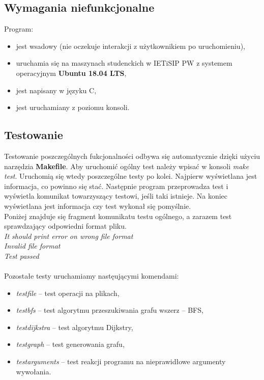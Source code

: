 \documentclass{article}
\begin{document}
\subsection{Wymagania niefunkcjonalne}
Program:
\begin{itemize}
    \item jest wsadowy (nie oczekuje interakcji z użytkownikiem po uruchomieniu),
    \item uruchamia się na maszynach studenckich w IETiSIP PW z systemem operacyjnym \textbf{Ubuntu 18.04 LTS},
    \item jest napisany w języku C, 
    \item jest uruchamiany z poziomu konsoli.
\end{itemize}

\newpage
\subsection{Testowanie}
Testowanie poszczególnych fukcjonalności odbywa się automatycznie dzięki użyciu narzędzia \textbf{Makefile}. Aby uruchomić ogólny test należy wpisać w konsoli \emph{make test}.
Uruchomią się wtedy poszczególne testy po kolei. Najpierw wyświetlana jest informacja, co powinno się stać. Następnie program przeprowadza test i wyświetla komunikat towarzyszący testowi, jeśli taki istnieje. Na koniec wyświetlana jest informacja czy test wykonał się pomyślnie.\\
Poniżej znajduje się fragment komunikatu testu ogólnego, a zarazem test sprawdzający odpowiedni format pliku.
\vspace{5mm}
\\
\textit{It should print error on wrong file format}\\
\textit{Invalid file format}\\
\textit{Test passed}\\
\vspace{5mm}
\\
Pozostałe testy uruchamiamy nastęującymi komendami:
\begin{itemize}
    \item \emph{test\textunderscore file} -- test operacji na plikach,
    \item \emph{test\textunderscore bfs} -- test algorytmu przeszukiwania grafu wszerz -- BFS,
    \item \emph{test\textunderscore dijkstra} -- test algorytmu Dijkstry,
    \item \emph{test\textunderscore graph} -- test generowania grafu,
    \item \emph{test\textunderscore arguments} -- test reakcji programu na nieprawidłowe argumenty wywołania.
\end{itemize}
\end{document}
